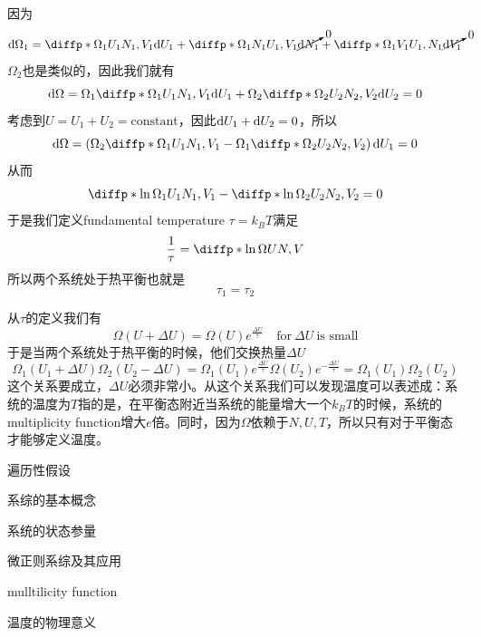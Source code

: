 因为\begin{equation}
       \di \Omega_1=\diffp*{{\Omega_1}}{{U_1}}{{N_1,V_1}}\di U_1 + \diffp*{{\Omega_1}}{{N_1}}{{U_1,V_1}}\cancelto{0}{\di N_1}+\diffp*{{\Omega_1}}{{V_1}}{{U_1,N_1}}\cancelto{0}{\di V_1}
\end{equation}
$\Omega_2$也是类似的，因此我们就有\begin{equation}
       \di \Omega=\Omega_1\diffp*{{\Omega_1}}{{U_1}}{{N_1,V_1}}\di U_1 + \Omega_2\diffp*{{\Omega_2}}{{U_2}}{{N_2,V_2}}\di U_2=0
\end{equation}
考虑到$U=U_1+U_2=\text{constant}$，因此$\mathrm{d} U_1+\mathrm{d} U_2=0$，所以\begin{equation}
       \di \Omega=\left(\Omega_2\diffp*{{\Omega_1}}{{U_1}}{{N_1,V_1}}- \Omega_1\diffp*{{\Omega_2}}{{U_2}}{{N_2,V_2}}\right)\di U_1=0
\end{equation}
从而
\begin{equation}
       \diffp*{{\ln \Omega_1}}{{U_1}}{{N_1,V_1}}- \diffp*{{\ln \Omega_2}}{{U_2}}{{N_2,V_2}}=0
\end{equation}
于是我们定义fundamental temperature $\tau =k_B T$满足\begin{equation}
       \frac{1}{\tau}=\diffp*{{\ln \Omega}}{{U}}{{N,V}}
\end{equation}
所以两个系统处于热平衡也就是\begin{equation}
       \tau_1=\tau_2
\end{equation}

从$\tau$的定义我们有\begin{equation}
       \Omega(U+\Delta U)=\Omega(U) e^{\frac{\Delta U}{\tau}}\quad\text{for}\ \Delta U\ \text{is small}
\end{equation}
于是当两个系统处于热平衡的时候，他们交换热量$\Delta U$\begin{equation}
       \Omega_1(U_1+\Delta U)\Omega_2(U_2-\Delta U)=\Omega_1(U_1) e^{\frac{\Delta U}{\tau}}\Omega(U_2)e^{-\frac{\Delta U}{\tau}}=\Omega_1(U_1)\Omega_2(U_2)
\end{equation}
这个关系要成立，$\Delta U$必须非常小。从这个关系我们可以发现温度可以表述成：系统的温度为$T$指的是，在平衡态附近当系统的能量增大一个$k_B T$的时候，系统的multiplicity function增大$e$倍。同时，因为$\Omega$依赖于$N,U,T$，所以只有对于平衡态才能够定义温度。



\begin{review}
     \item 遍历性假设
     \item 系综的基本概念
     \item 系统的状态参量
     \item 微正则系综及其应用
     \item mulltilicity function
     \item 温度的物理意义
\end{review}

